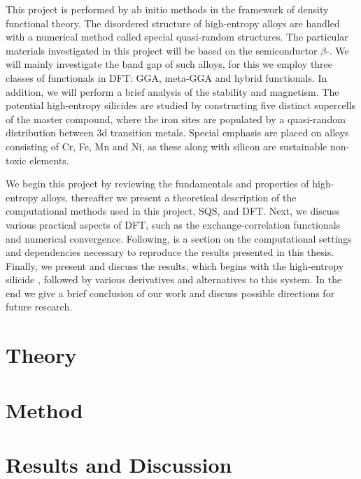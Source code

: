 \documentclass[UKenglish]{ifimaster}  %
\begin{document}
This project is performed by ab initio methods in the framework of density functional theory. The disordered structure of high-entropy alloys are handled with a numerical method called special quasi-random structures. The particular materials investigated in this project will be based on the semiconductor $\beta$-. We will mainly investigate the band gap of such alloys, for this we employ three classes of functionals in DFT: GGA, meta-GGA and hybrid functionals. In addition, we will perform a brief analysis of the stability and magnetism. The potential high-entropy silicides are studied by  constructing five distinct supercells of the master compound, where the iron sites are populated by a quasi-random distribution between 3d transition metals. Special emphasis are placed on alloys consisting of Cr, Fe, Mn and Ni, as these along with silicon are sustainable non-toxic elements.  

We begin this project by reviewing the fundamentals and properties of high-entropy alloys, thereafter we present a theoretical description of the computational methods used in this project, SQS, and DFT. Next, we discuss various practical aspects of DFT, such as the exchange-correlation functionals and numerical convergence. Following, is a section on the computational settings and dependencies necessary to reproduce the results presented in this thesis. Finally, we present and discuss the results, which begins with the high-entropy silicide , followed by various derivatives and alternatives to this system.  In the end we give a brief conclusion of our work and discuss possible directions for future research.


\part{Theory}                    %




\part{Method}


 
\part{Results and Discussion}


\end{document}

